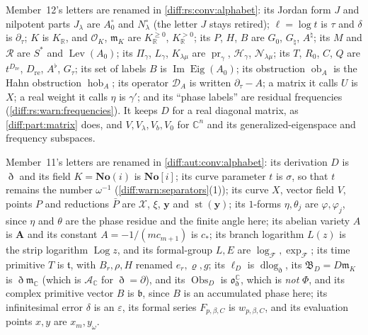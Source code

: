 \documentclass[11pt,letterpaper]{article}
\numberwithin{equation}{section}
\theoremstyle{definition}
\theoremstyle{remark}
\newcommand{\No}{\mathbf{No}}
\newcommand{\SC}{\mathbf{No}[i]}
\newcommand{\R}{\mathbb R}
\newcommand{\C}{\mathbb C}
\newcommand{\der}{\partial}
\newcommand{\mm}{\mathfrak m}
\newcommand{\Acl}{\mathcal A}
\newcommand{\Obs}{\mathfrak o}
\newcommand{\st}{\operatorname{st}}
\newcommand{\Imm}{\operatorname{Im}}
\newcommand{\derT}{\der_{\tau}}
\newcommand{\KR}{K_{\R}}
\newcommand{\Eig}{\operatorname{Eig}}
\newcommand{\Lev}{\operatorname{Lev}}
\newcommand{\hob}{\operatorname{hob}}
\newcommand{\pr}{\operatorname{pr}}
\newcommand{\Dn}{\eth}
\newcommand{\dlog}{\operatorname{dlog}}
\newcommand{\Log}{\operatorname{Log}}
\begin{document}
\begin{warning}
Member~12's letters are renamed in \cref{diff:rs:conv:alphabet}: its Jordan form
$J$ and nilpotent parts $J_{\lambda}$ are $A_{0}^{\circ}$ and $N^{\circ}_{\lambda}$
(the letter $J$ stays retired); $\ell=\log t$ is $\tau$ and $\delta$ is $\derT$;
$K$ is $\KR$, and $\mathcal O_{K}$, $\mathfrak m_{K}$ are $\KR^{\geq0}$, $\KR^{>0}$;
its $P$, $H$, $B$ are $G_{0}$, $G_{\natural}$, $A^{\natural}$; its $M$ and
$\mathcal R$ are $S^{*}$ and $\Lev(A_{0})$; its $\Pi_{\gamma}$, $L_{\gamma}$,
$K_{\lambda\mu}$ are $\pr_{\gamma}$, $\mathcal H_{\gamma}$, $\mathcal N_{\lambda\mu}$;
its $T$, $R_{0}$, $C$, $Q$ are $t^{D_{\mathrm{re}}}$, $D_{\mathrm{re}}$, $A^{\flat}$,
$G_{\tau}$; its set of labels $B$ is $\Imm\Eig(A_{0})$; its obstruction $\operatorname{ob}_{A}$ is
the Hahn obstruction $\hob_{A}$; its operator $\mathcal D_{A}$ is written
$\derT-A$; a matrix it calls $U$ is $X$; a real weight it calls $\eta$ is
$\gamma'$; and its ``phase labels'' are residual frequencies
(\cref{diff:rs:warn:frequencies}). It keeps $D$ for a real diagonal matrix, as
\cref{diff:part:matrix} does, and $V,V_{\lambda},V_{b},V_{0}$ for $\C^{n}$ and its
generalized-eigenspace and frequency subspaces.

Member~11's letters are renamed in \cref{diff:aut:conv:alphabet}: its derivation
$D$ is $\Dn$ and its field $K=\No(i)$ is $\SC$; its curve parameter $t$ is
$\sigma$, so that $t$ remains the number $\omega^{-1}$
(\cref{diff:warn:separators}(1)); its curve $X$, vector field $V$, points $P$ and
reductions $\bar P$ are $\mathcal X$, $\xi$, $\mathbf y$ and $\st(\mathbf y)$; its
$1$-forms $\eta,\theta_{j}$ are $\varphi,\varphi_{j}$, since $\eta$ and $\theta$
are the phase residue and the finite angle here; its abelian variety $A$ is
$\mathbf A$ and its constant $A=-1/(mc_{m+1})$ is $c_{\ast}$; its branch logarithm
$L(z)$ is the strip logarithm $\Log z$, and its formal-group $L,E$ are
$\log_{\mathcal F},\exp_{\mathcal F}$; its time primitive $T$ is $\mathfrak t$, with
$B_{r},\rho,H$ renamed $e_{r},\varrho,g$; its $\ell_{D}$ is $\dlog_{\Dn}$, its
$\mathfrak B_{D}=D\mathfrak m_{K}$ is $\Dn\mm_{\C}$ (which is $\Acl_{\C}$ for
$\Dn=\der$), and its $\operatorname{Obs}_{D}$ is $\Obs^{\C}_{\Dn}$, which is
\emph{not} $\Phi$, and its complex primitive vector $B$ is $\mathfrak b$, since $B$
is an accumulated phase here; its infinitesimal error $\delta$ is an
$\varepsilon$, its formal series $F_{p,\beta,C}$ is $w_{p,\beta,C}$, and its
evaluation points $x,y$ are $x_{m},y_{\omega}$.


\end{warning}
\end{document}
